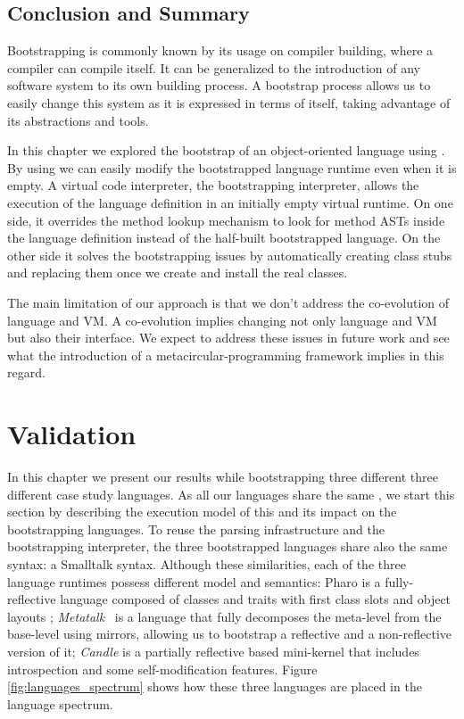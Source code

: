 \section{Conclusion and Summary}

Bootstrapping is commonly known by its usage on compiler building, where a compiler can compile itself.
It can be generalized to the introduction of any software system to its own building process.
A bootstrap process allows us to easily change this system as it is expressed in terms of itself, taking advantage of its abstractions and tools.

In this chapter we explored the bootstrap of an object-oriented language using \Vtt. By using \Vtt we can easily modify the bootstrapped language runtime even when it is empty. A virtual code interpreter, the bootstrapping interpreter, allows the execution of the language definition in an initially empty virtual runtime. On one side, it overrides the method lookup mechanism to look for method ASTs inside the language definition instead of the half-built bootstrapped language. On the other side it solves the bootstrapping issues by automatically creating class stubs and replacing them once we create and install the real classes.

The main limitation of our approach is that we don't address the co-evolution of language and VM. A co-evolution implies changing not only language and VM but also their interface. We expect to address these issues in future work and see what the introduction of a metacircular-programming framework implies in this regard.

\chapter{Validation} \label{sec:bootstrapping_validation}
\introduction

In this chapter we present our results while bootstrapping three different three different case study languages.
As all our languages share the same \VM, we start this section by describing the execution model of this \VM and its impact on the bootstrapping languages.
To reuse the parsing infrastructure and the bootstrapping interpreter, the three bootstrapped languages share also the same syntax: a Smalltalk syntax. Although these similarities, each of the three language runtimes possess different model and semantics: Pharo is a fully-reflective language composed of classes and traits with first class slots and object layouts \cite{Verw11a}; \emph{Metatalk}~\cite{Papo11a} is a language that fully decomposes the meta-level from the base-level using mirrors, allowing us to bootstrap a reflective and a non-reflective version of it; \emph{Candle} is a partially reflective  based mini-kernel that includes introspection and some self-modification features. Figure \ref{fig:languages_spectrum} shows how these three languages are placed in the language spectrum.%

